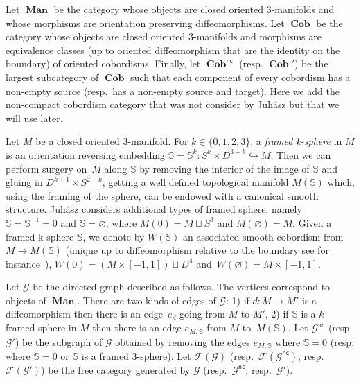 \documentclass[pdftex]{sigma}
\numberwithin{equation}{section}
\numberwithin{theorem}{section}
\numberwithin{proposition}{section}
\numberwithin{definition}{section}
\numberwithin{lemma}{section}
\numberwithin{corollary}{section}
\numberwithin{remark}{section}
\numberwithin{example}{section}
\newcommand{\cob}{\operatorname{\textbf{Cob}}}
\newcommand{\nc}[1]{{#1^{\mathsf{nc}}}}
\newcommand{\man}{\operatorname{\textbf{Man}}}
\newcommand{\Sp}{\mathbb{S}}
\begin{document}
Let $\man$ be the category whose objects are closed oriented 3-manifolds and whose morphisms are
orientation preserving diffeomorphisms.
 Let $\cob$ be the category whose objects are closed oriented 3-manifolds and morphisms are equivalence classes (up to oriented diffeomorphism that are the identity on the boundary) of oriented cobordisms.
 Finally, let $\nc\cob$ (resp. $\cob'$) be the largest subcategory of $\cob$ such that each component of every cobordism has a non-empty source (resp.\ has a non-empty source and target).
 Here we add the non-compact cobordism category that
 was not consider
 by Juh\'asz but that we will use later.

Let $M$ be a closed oriented 3-manifold. For
$k\in \{0,1,2,3\}$, a \emph{framed k-sphere} in $M$ is an orientation reversing embedding $\Sp=\Sp^k\colon S^k \times D^{3-k} \hookrightarrow M$.
Then we can perform surgery on~$M$ along $\Sp$ by removing the interior of the image of $\Sp$ and gluing in $D^{k+1} \times S^{2-k}$, getting a well defined topological manifold $M(\Sp)$ which, using the framing of the sphere, can be endowed with a canonical smooth structure.
 Juh\'asz considers additional types of framed sphere, namely $\Sp=\Sp^{-1}=0$ and $\Sp=\varnothing$, where $M(0)=M \sqcup S^3$ and
$M(\varnothing)=M$. Given a framed k-sphere $\Sp$,
 we denote by $W(\Sp)$ an associated smooth cobordism from $M \to M(\Sp)$ (unique up to diffeomorphism relative to the boundary see for instance~\cite[Theorem~3.13]{Mil1965}), $W(0)=(M\times[-1,1])\sqcup D^4$ and~${W(\varnothing)=M\times [-1,1]}$.

Let $\mathcal{G}$ be the directed graph described as follows. The vertices correspond to objects of $\man$. There are two kinds of edges of $\mathcal{G}$: 1) if $d\colon M \to M'$ is a diffeomorphism then there is an edge~$e_d$ going from $M$ to $M'$, 2) if $\Sp$ is a $k$-framed sphere in $M$ then
there is an edge $e_{M,\Sp}$ from $M$ to~$M(\Sp)$. Let $\nc{\mathcal G}$ (resp. $\mathcal{G'}$) be the subgraph of $\mathcal{G}$ obtained by removing the edges $e_{M,\Sp}$ where $\Sp=0$ (resp. where $\Sp=0$ or $\Sp$ is a framed $3$-sphere). Let $\mathcal{F}(\mathcal{G})$ (resp.\ $\mathcal{F}(\nc{\mathcal G})$, resp.\ $\mathcal{F}(\mathcal{G}')$) be the free category generated by $\mathcal{G}$ (resp.\ $\nc{\mathcal G}$, resp.\ $\mathcal{G}'$).
\end{document}
